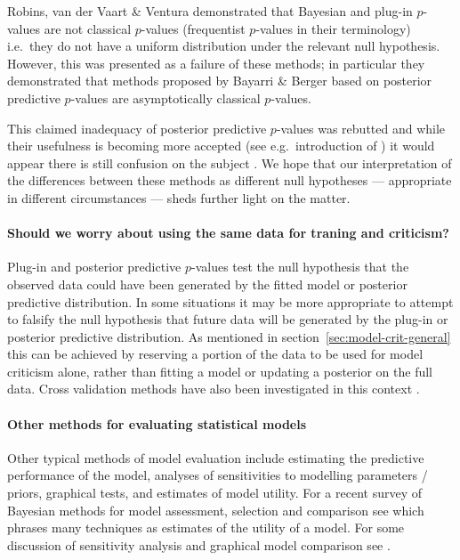 \documentclass{article} %
\def\ie{i.e.\ }
\def\eg{e.g.\ }
\begin{document}
Robins, van der Vaart \& Ventura \citep{Robins2000-oz} demonstrated that Bayesian and plug-in $p$-values are not classical $p$-values (frequentist $p$-values in their terminology) \ie they do not have a uniform distribution under the relevant null hypothesis.
However, this was presented as a failure of these methods; in particular they demonstrated that methods proposed by Bayarri \& Berger \citep{Bayarri1999-ty} based on posterior predictive $p$-values are asymptotically classical $p$-values.

This claimed inadequacy of posterior predictive $p$-values was rebutted \citep{Gelman2003-xx} and while their usefulness is becoming more accepted (see \eg introduction of \cite{Bayarri2007-cp}) it would appear there is still confusion on the subject \citep{Gelman2013-am}.
We hope that our interpretation of the differences between these methods as different null hypotheses --- appropriate in different circumstances --- sheds further light on the matter.

\paragraph{Should we worry about using the same data for traning and criticism?}

Plug-in and posterior predictive $p$-values test the null hypothesis that the observed data could have been generated by the fitted model or posterior predictive distribution.
In some situations it may be more appropriate to attempt to falsify the null hypothesis that future data will be generated by the plug-in or posterior predictive distribution.
As mentioned in section~\ref{sec:model-crit-general} this can be achieved by reserving a portion of the data to be used for model criticism alone, rather than fitting a model or updating a posterior on the full data.
Cross validation methods have also been investigated in this context \citep[e.g.][]{Gelfand1992-ow, Marshall2007-hd}.

\paragraph{Other methods for evaluating statistical models}

Other typical methods of model evaluation include estimating the predictive performance of the model, analyses of sensitivities to modelling parameters / priors, graphical tests, and estimates of model utility.
For a recent survey of Bayesian methods for model assessment, selection and comparison see \cite{Vehtari2012-oh} which phrases many techniques as estimates of the utility of a model.
For some discussion of sensitivity analysis and graphical model comparison see \citep[e.g.][]{Gelman2013-st}.
\end{document}
